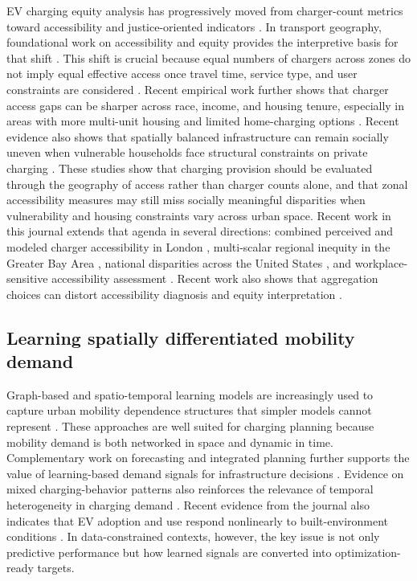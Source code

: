 \documentclass[final,5p,times,twocolumn,authoryear]{elsarticle}
\begin{document}
EV charging equity analysis has progressively moved from charger-count metrics toward
accessibility and justice-oriented indicators
\citep{Hopkins2023,Varghese2024}. In transport geography, foundational work on
accessibility and equity provides the interpretive basis for that shift
\citep{Geurs2004,Delbosc2011,Bocarejo2012}. This shift is crucial because equal numbers of
chargers across zones do not imply equal effective
access once travel time, service type, and user constraints are considered
\citep{Jiao2024,Lezcano2025,Peng2024Equity}. Recent empirical work further shows that
charger access gaps can be sharper across race, income, and housing tenure, especially in
areas with more multi-unit housing and limited home-charging options
\citep{HsuFingerman2021,Gan2023MUD,Malabanan2026}. Recent evidence also shows that
spatially balanced infrastructure can remain socially uneven when vulnerable households face
structural constraints on private charging \citep{Carlton2024,Yu2025,Chen2025Equity}.
These studies show that charging provision should be evaluated through the geography of
access rather than charger counts alone, and that zonal accessibility measures may still miss
socially meaningful disparities when vulnerability and housing constraints vary across urban
space. Recent work in this journal extends that agenda in several directions: combined
perceived and modeled charger accessibility in London \citep{ZhangCao2025}, multi-scalar
regional inequity in the Greater Bay Area \citep{Gao2025GBA}, national disparities across the
United States \citep{Bashar2026}, and workplace-sensitive accessibility assessment
\citep{Cai2026}. Recent work also shows that aggregation choices can distort accessibility
diagnosis and equity interpretation \citep{Qu2026}.

\subsection{Learning spatially differentiated mobility demand}

Graph-based and spatio-temporal learning models are increasingly used to capture urban
mobility dependence structures that simpler models cannot represent
\citep{Wang2023HSTGCN,Cavus2025HCBNet}. These approaches are well suited for charging
planning because mobility demand is both networked in space and dynamic in time.
Complementary work on forecasting and integrated planning further supports the value of
learning-based demand signals for infrastructure decisions
\citep{Wang2023LSTM,Alaraj2025,Wang2025iScience}. Evidence on mixed charging-behavior patterns
also reinforces the relevance of temporal heterogeneity in charging demand \citep{Lee2020}.
Recent evidence from the journal also indicates that EV adoption and use respond nonlinearly
to built-environment conditions \citep{Tian2026}.
In data-constrained contexts, however, the key issue is not only predictive performance but
how learned signals are converted into optimization-ready targets.
\end{document}
